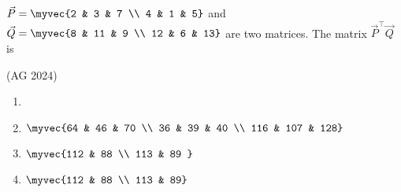 \item $\vec{P} = \myvec {2 & 3 & 7 \\ 4 & 1 & 5} $ and $\vec{Q} = \myvec {8 & 11 & 9 \\ 12 & 6 & 13}$ are two matrices. The matrix $\vec{P}^{\top}\vec{Q}$ is

 \hfill(AG 2024)
\begin{multicols}{2}
\begin{enumerate}
\item  {}
\item  $\myvec {64 & 46 & 70 \\ 36 & 39 & 40 \\ 116 & 107 & 128}$ 
\item $\myvec {112 & 88 \\ 113 & 89 }$ 
\item $\myvec {112 & 88 \\ 113 & 89}$
\end{enumerate}
\end{multicols}
